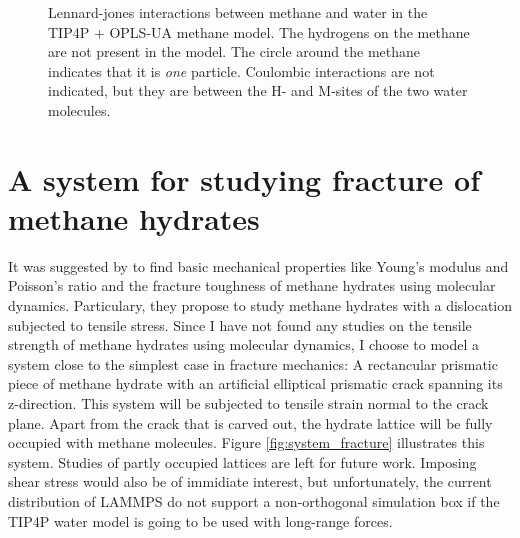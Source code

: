\begin{figure}
\centering
{}
\caption{Lennard-jones interactions between methane and water in the TIP4P + OPLS-UA methane model. The hydrogens on the methane are not present in the model. The circle around the methane indicates that it is \emph{one} particle. Coulombic interactions are not indicated, but they are between the H- and M-sites of the two water molecules.}
\end{figure}


\section{A system for studying fracture of methane hydrates}
It was suggested by \citet{Ning2012} to find basic mechanical properties like Young's modulus and Poisson's ratio and the fracture toughness of methane hydrates using molecular dynamics. Particulary, they propose to study methane hydrates with a dislocation subjected to tensile stress. Since I have not found any studies on the tensile strength of methane hydrates using molecular dynamics, I choose to model a system close to the simplest case in fracture mechanics: A rectancular prismatic piece of methane hydrate with an artificial elliptical prismatic crack spanning its z-direction. This system will be subjected to tensile strain normal to the crack plane. Apart from the crack that is carved out, the hydrate lattice will be fully occupied with methane molecules. Figure \ref{fig:system_fracture} illustrates this system. Studies of partly occupied lattices are left for future work. Imposing shear stress would also be of immidiate interest, but unfortunately, the current distribution of LAMMPS do not support a non-orthogonal simulation box if the TIP4P water model is going to be used with long-range forces.

